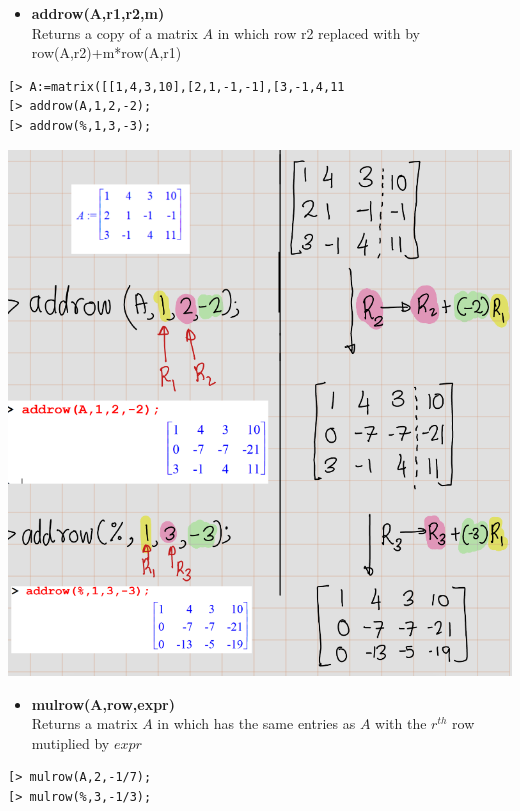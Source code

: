 \documentclass[
]{book}
\providecommand{\tightlist}{%
  \setlength{\itemsep}{0pt}\setlength{\parskip}{0pt}}
\theoremstyle{definition}
\theoremstyle{definition}
\theoremstyle{definition}
\theoremstyle{definition}
\theoremstyle{remark}
\begin{document}
\begin{itemize}
\tightlist
\item
  \textbf{addrow(A,r1,r2,m)}\\
  Returns a copy of a matrix \(A\) in which row r2 replaced with by row(A,r2)+m*row(A,r1)
\end{itemize}

\begin{verbatim}
[> A:=matrix([[1,4,3,10],[2,1,-1,-1],[3,-1,4,11
[> addrow(A,1,2,-2);
[> addrow(%,1,3,-3);
\end{verbatim}

\includegraphics{figures/Lesson 4/fig9.png}

\begin{itemize}
\tightlist
\item
  \textbf{mulrow(A,row,expr)}\\
  Returns a matrix \(A\) in which has the same entries as \(A\) with the \(r^{th}\) row mutiplied by \(expr\)
\end{itemize}

\begin{verbatim}
[> mulrow(A,2,-1/7);
[> mulrow(%,3,-1/3);
\end{verbatim}
\end{document}

